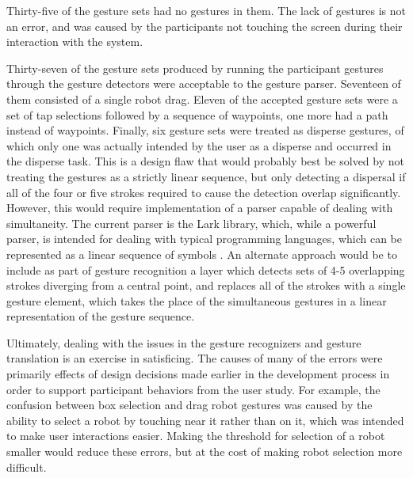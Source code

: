 Thirty-five of the gesture sets had no gestures in them. The lack of gestures is not an error, and was caused by the participants not touching the screen during their interaction with the system. 

Thirty-seven of the gesture sets produced by running the participant gestures through the gesture detectors were acceptable to the gesture parser. 
Seventeen of them consisted of a single robot drag. 
Eleven of the accepted gesture sets were a set of tap selections followed by a sequence of waypoints, one more had a path instead of waypoints. 
Finally, six gesture sets were treated as disperse gestures, of which only one was actually intended by the user as a disperse and occurred in the disperse task. 
This is a design flaw that would probably best be solved by not treating the gestures as a strictly linear sequence, but only detecting a dispersal if all of the four or five strokes required to cause the detection overlap significantly. 
However, this would require implementation of a parser capable of dealing with simultaneity. 
The current parser is the Lark library, which, while a powerful parser, is intended for dealing with typical programming languages, which can be represented as a linear sequence of symbols \citep{LarkParser}. 
An alternate approach would be to include as part of gesture recognition a layer which detects sets of 4-5 overlapping strokes diverging from a central point, and replaces all of the strokes with a single gesture element, which takes the place of the simultaneous gestures in a linear representation of the gesture sequence. 

Ultimately, dealing with the issues in the gesture recognizers and gesture translation is an exercise in satisficing. 
The causes of many of the errors were primarily effects of design decisions made earlier in the development process in order to support participant behaviors from the user study. 
For example, the confusion between box selection and drag robot gestures was caused by the ability to select a robot by touching near it rather than on it, which was intended to make user interactions easier. 
Making the threshold for selection of a robot smaller would reduce these errors, but at the cost of making robot selection more difficult. 

%

